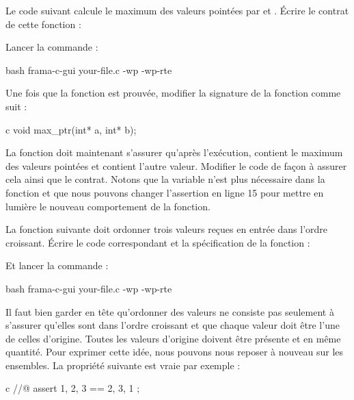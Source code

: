 

Le code suivant calcule le maximum des valeurs pointées par 
et . Écrire le contrat de cette fonction :




Lancer la commande :


\begin{CodeBlock}{bash}
frama-c-gui your-file.c -wp -wp-rte
\end{CodeBlock}


Une fois que la fonction est prouvée, modifier la signature de la
fonction comme suit :


\begin{CodeBlock}{c}
void max_ptr(int* a, int* b);
\end{CodeBlock}


La fonction doit maintenant s'assurer qu'après l'exécution, 
contient le maximum des valeurs pointées et  contient l'autre
valeur. Modifier le code de façon à assurer cela ainsi que le contrat.
Notons que la variable   n'est plus nécessaire dans la fonction
 et que nous pouvons changer l'assertion en ligne 15 pour
mettre en lumière le nouveau comportement de la fonction.




La fonction suivante doit ordonner trois valeurs reçues en entrée dans
l'ordre croissant. Écrire le code correspondant et la spécification de la
fonction :



Et lancer la commande :


\begin{CodeBlock}{bash}
frama-c-gui your-file.c -wp -wp-rte
\end{CodeBlock}


Il faut bien garder en tête qu'ordonner des valeurs ne consiste pas seulement
à s'assurer qu'elles sont dans l'ordre croissant et que chaque valeur doit
être l'une de celles d'origine. Toutes les valeurs d'origine doivent être
présente et en même quantité. Pour exprimer cette idée, nous pouvons nous
reposer à nouveau sur les ensembles. La propriété suivante est vraie par
exemple :


\begin{CodeBlock}{c}
//@ assert { 1, 2, 3 } == { 2, 3, 1 };
\end{CodeBlock}


